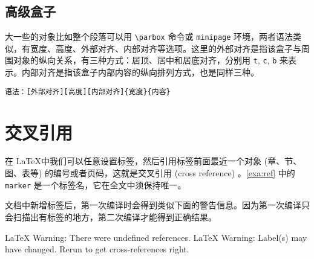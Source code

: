\begin{example}[htbp]
\caption{ \texttt{makebox}和 \texttt{framebox}}
\label{exa:makebox}
\end{example}

\subsection{高级盒子}

大一些的对象比如整个段落可以用 \verb|\parbox| 命令或 \texttt{minipage} 环境，两者语法类似，有宽度、高度、外部对齐、内部对齐等选项。这里的外部对齐是指该盒子与周围对象的纵向关系，有三种方式：居顶、居中和居底对齐，分别用 \texttt{t}, \texttt{c}, \texttt{b} 来表示。内部对齐是指该盒子内部内容的纵向排列方式，也是同样三种。

\verb|语法：[外部对齐][高度][内部对齐]{宽度}{内容}|

\begin{example}[htbp]

\caption{\texttt{parbox} 和 \texttt{minipage}}
\label{exa:parbox}
\end{example}


\section{交叉引用}
\label{sec:crossref}

在 \LaTeX 中我们可以任意设置标签，然后引用标签前面最近一个对象 (章、节、图、表等) 的编号或者页码，这就是交叉引用 (cross reference) 。\autoref{exa:ref} 中的 \texttt{marker} 是一个标签名，它在全文中须保持唯一。

\begin{example}[h]
\caption{交叉引用}
\label{exa:ref}
\end{example}

文档中新增标签后，第一次编译时会得到类似下面的警告信息。因为第一次编译只会扫描出有标签的地方，第二次编译才能得到正确结果。

\begin{Code}[]
LaTeX Warning: There were undefined references.
LaTeX Warning: Label(s) may have changed. Rerun to get cross-references right.
\end{Code}



